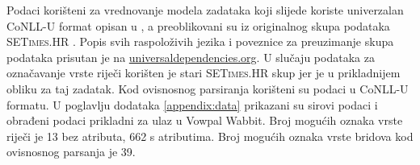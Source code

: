 Podaci korišteni za vrednovanje modela zadataka koji slijede koriste univerzalan
CoNLL-U format opisan u \citep{univdeps12}, a preoblikovani su iz originalnog
skupa podataka \textsc{SETimes.HR} \citep{agic2014setimes}. Popis svih
raspoloživih jezika i poveznice za preuzimanje skupa podataka prisutan je na
\href{http://universaldependencies.org/}{universaldependencies.org}. U slučaju
podataka za označavanje vrste riječi korišten je stari \textsc{SETimes.HR} skup
jer je u prikladnijem obliku za taj zadatak. Kod ovisnosnog parsiranja korišteni
su podaci u CoNLL-U formatu. U poglavlju dodataka \ref{appendix:data} prikazani
su sirovi podaci i obrađeni podaci prikladni za ulaz u Vowpal Wabbit. Broj
mogućih oznaka vrste riječi je 13 bez atributa, 662 s atributima. Broj mogućih
oznaka vrste bridova kod ovisnosnog parsanja je 39.
